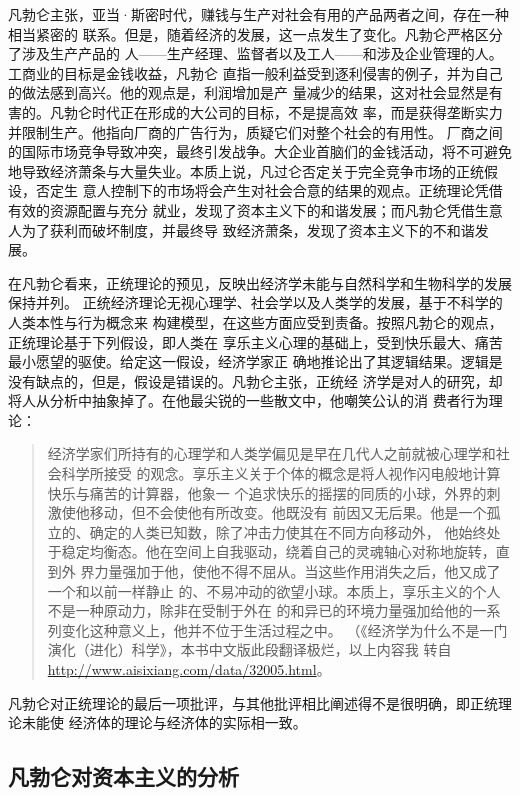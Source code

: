 凡勃仑主张，亚当·斯密时代，赚钱与生产对社会有用的产品两者之间，存在一种相当紧密的
联系。但是，随着经济的发展，这一点发生了变化。凡勃仑严格区分了涉及生产产品的
人——生产经理、监督者以及工人——和涉及企业管理的人。工商业的目标是金钱收益，凡勃仑
直指一般利益受到逐利侵害的例子，并为自己的做法感到高兴。他的观点是，利润增加是产
量减少的结果，这对社会显然是有害的。凡勃仑时代正在形成的大公司的目标，不是提高效
率，而是获得垄断实力并限制生产。他指向厂商的广告行为，质疑它们对整个社会的有用性。
厂商之间的国际市场竞争导致冲突，最终引发战争。大企业首脑们的金钱活动，将不可避免
地导致经济萧条与大量失业。本质上说，凡过仑否定关于完全竞争市场的正统假设，否定生
意人控制下的市场将会产生对社会合意的结果的观点。正统理论凭借有效的资源配置与充分
就业，发现了资本主义下的和谐发展；而凡勃仑凭借生意人为了获利而破坏制度，并最终导
致经济萧条，发现了资本主义下的不和谐发展。

在凡勃仑看来，正统理论的预见，反映出经济学未能与自然科学和生物科学的发展保持并列。
正统经济理论无视心理学、社会学以及人类学的发展，基于不科学的人类本性与行为概念来
构建模型，在这些方面应受到责备。按照凡勃仑的观点，正统理论基于下列假设，即人类在
享乐主义心理的基础上，受到快乐最大、痛苦最小愿望的驱使。给定这一假设，经济学家正
确地推论出了其逻辑结果。逻辑是没有缺点的，但是，假设是错误的。凡勃仑主张，正统经
济学是对人的研究，却将人从分析中抽象掉了。在他最尖锐的一些散文中，他嘲笑公认的消
费者行为理论：

\begin{quotation}
  经济学家们所持有的心理学和人类学偏见是早在几代人之前就被心理学和社会科学所接受
  的观念。享乐主义关于个体的概念是将人视作闪电般地计算快乐与痛苦的计算器，他象一
  个追求快乐的摇摆的同质的小球，外界的刺激使他移动，但不会使他有所改变。他既没有
  前因又无后果。他是一个孤立的、确定的人类已知数，除了冲击力使其在不同方向移动外，
  他始终处于稳定均衡态。他在空间上自我驱动，绕着自己的灵魂轴心对称地旋转，直到外
  界力量强加于他，使他不得不屈从。当这些作用消失之后，他又成了一个和以前一样静止
  的、不易冲动的欲望小球。本质上，享乐主义的个人不是一种原动力，除非在受制于外在
  的和异已的环境力量强加给他的一系列变化这种意义上，他并不位于生活过程之中。
  （《经济学为什么不是一门演化（进化）科学》，本书中文版此段翻译极烂，以上内容我
  转自\url{http://www.aisixiang.com/data/32005.html}。
\end{quotation}

凡勃仑对正统理论的最后一项批评，与其他批评相比阐述得不是很明确，即正统理论未能使
经济体的理论与经济体的实际相一致。

\subsection{凡勃仑对资本主义的分析}

